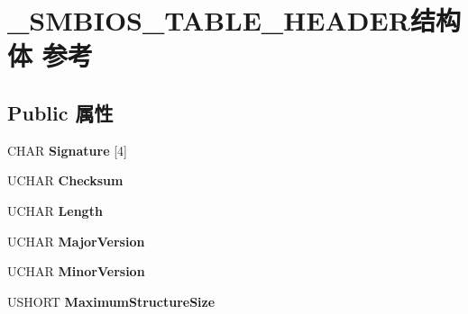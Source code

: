 \hypertarget{struct___s_m_b_i_o_s___t_a_b_l_e___h_e_a_d_e_r}{}\section{\+\_\+\+S\+M\+B\+I\+O\+S\+\_\+\+T\+A\+B\+L\+E\+\_\+\+H\+E\+A\+D\+E\+R结构体 参考}
\label{struct___s_m_b_i_o_s___t_a_b_l_e___h_e_a_d_e_r}
\subsection*{Public 属性}
\begin{DoxyCompactItemize}
\item 
\mbox{\label{struct___s_m_b_i_o_s___t_a_b_l_e___h_e_a_d_e_r_a6477938527d49a5620be1ad325ccca8f}} 
C\+H\+AR {\bfseries Signature} \mbox{[}4\mbox{]}
\item 
\mbox{\label{struct___s_m_b_i_o_s___t_a_b_l_e___h_e_a_d_e_r_a0d92a17a2ad13ee64176fb9ef5680949}} 
U\+C\+H\+AR {\bfseries Checksum}
\item 
\mbox{\label{struct___s_m_b_i_o_s___t_a_b_l_e___h_e_a_d_e_r_a7651d4e81ad9d9d27b3959fd6edfc8c7}} 
U\+C\+H\+AR {\bfseries Length}
\item 
\mbox{\label{struct___s_m_b_i_o_s___t_a_b_l_e___h_e_a_d_e_r_a40be8eea6c2aeeca7ded9f5b5dbb725e}} 
U\+C\+H\+AR {\bfseries Major\+Version}
\item 
\mbox{\label{struct___s_m_b_i_o_s___t_a_b_l_e___h_e_a_d_e_r_ad536dbe46941ca66831a52e005adc972}} 
U\+C\+H\+AR {\bfseries Minor\+Version}
\item 
\mbox{\label{struct___s_m_b_i_o_s___t_a_b_l_e___h_e_a_d_e_r_ac171404ead95d7d49655cbf8a7e440ce}} 
U\+S\+H\+O\+RT {\bfseries Maximum\+Structure\+Size}
\item 
\mbox{\label{struct___s_m_b_i_o_s___t_a_b_l_e___h_e_a_d_e_r_aa100ddba54042b9b7a35c2e34164b5da}} 

\end{DoxyCompactItemize}
